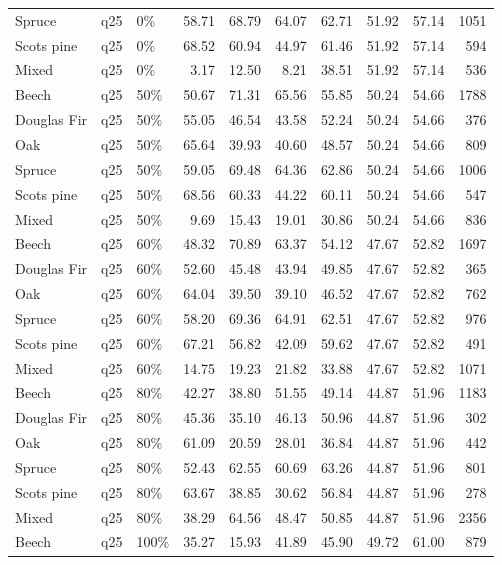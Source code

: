 \begin{longtable}{lllrrrrrrr}
  Spruce & q25 & 0\% & 58.71 & 68.79 & 64.07 & 62.71 & 51.92 & 57.14 & 1051 \\ 
  Scots pine & q25 & 0\% & 68.52 & 60.94 & 44.97 & 61.46 & 51.92 & 57.14 & 594 \\ 
  Mixed & q25 & 0\% & 3.17 & 12.50 & 8.21 & 38.51 & 51.92 & 57.14 & 536 \\ 
  Beech & q25 & 50\% & 50.67 & 71.31 & 65.56 & 55.85 & 50.24 & 54.66 & 1788 \\ 
  Douglas Fir & q25 & 50\% & 55.05 & 46.54 & 43.58 & 52.24 & 50.24 & 54.66 & 376 \\ 
  Oak & q25 & 50\% & 65.64 & 39.93 & 40.60 & 48.57 & 50.24 & 54.66 & 809 \\ 
  Spruce & q25 & 50\% & 59.05 & 69.48 & 64.36 & 62.86 & 50.24 & 54.66 & 1006 \\ 
  Scots pine & q25 & 50\% & 68.56 & 60.33 & 44.22 & 60.11 & 50.24 & 54.66 & 547 \\ 
  Mixed & q25 & 50\% & 9.69 & 15.43 & 19.01 & 30.86 & 50.24 & 54.66 & 836 \\ 
  Beech & q25 & 60\% & 48.32 & 70.89 & 63.37 & 54.12 & 47.67 & 52.82 & 1697 \\ 
  Douglas Fir & q25 & 60\% & 52.60 & 45.48 & 43.94 & 49.85 & 47.67 & 52.82 & 365 \\ 
  Oak & q25 & 60\% & 64.04 & 39.50 & 39.10 & 46.52 & 47.67 & 52.82 & 762 \\ 
  Spruce & q25 & 60\% & 58.20 & 69.36 & 64.91 & 62.51 & 47.67 & 52.82 & 976 \\ 
  Scots pine & q25 & 60\% & 67.21 & 56.82 & 42.09 & 59.62 & 47.67 & 52.82 & 491 \\ 
  Mixed & q25 & 60\% & 14.75 & 19.23 & 21.82 & 33.88 & 47.67 & 52.82 & 1071 \\ 
  Beech & q25 & 80\% & 42.27 & 38.80 & 51.55 & 49.14 & 44.87 & 51.96 & 1183 \\ 
  Douglas Fir & q25 & 80\% & 45.36 & 35.10 & 46.13 & 50.96 & 44.87 & 51.96 & 302 \\ 
  Oak & q25 & 80\% & 61.09 & 20.59 & 28.01 & 36.84 & 44.87 & 51.96 & 442 \\ 
  Spruce & q25 & 80\% & 52.43 & 62.55 & 60.69 & 63.26 & 44.87 & 51.96 & 801 \\ 
  Scots pine & q25 & 80\% & 63.67 & 38.85 & 30.62 & 56.84 & 44.87 & 51.96 & 278 \\ 
  Mixed & q25 & 80\% & 38.29 & 64.56 & 48.47 & 50.85 & 44.87 & 51.96 & 2356 \\ 
  Beech & q25 & 100\% & 35.27 & 15.93 & 41.89 & 45.90 & 49.72 & 61.00 & 879 \\ 

\end{longtable}
